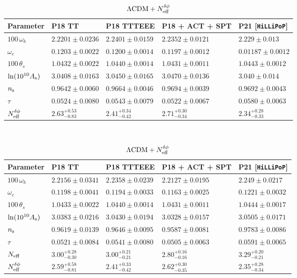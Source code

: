 \begin{subappendices}
\begin{table}
\begin{subtable}{\textwidth}
		\begin{tabular}{l l l l l}
				\toprule
			Parameter			& P18 TT					& P18 TTTEEE				& P18 + ACT + SPT			& P21 [\texttt{HiLLiPoP}]	\\
				\midrule[0.065em]
			$100\,\omega_b$		& $2.2201 \pm 0.0236$		& $2.2401 \pm 0.0159$		& $2.2352 \pm 0.0121$		& $2.229 \pm 0.013$			\\
			$\omega_c$			& $0.1203 \pm 0.0022$		& $0.1200 \pm 0.0014$		& $0.1197 \pm 0.0012$		& $0.01187 \pm 0.0012$		\\
			$100\,\theta_s$		& $1.0432 \pm 0.0022$		& $1.0440 \pm 0.0014$		& $1.0431 \pm 0.0011$		& $1.0443 \pm 0.0012$		\\
			$\ln(10^{10}A_\mathrm{s})$ & $3.0408 \pm 0.0163$		& $3.0450 \pm 0.0165$		& $3.0470 \pm 0.0136$		& $3.040 \pm 0.014$			\\
			$n_\mathrm{s}$				& $0.9642 \pm 0.0060$		& $0.9664 \pm 0.0046$		& $0.9694 \pm 0.0039$		& $0.9692 \pm 0.0043$		\\
			$\tau$				& $0.0524 \pm 0.0080$		& $0.0543 \pm 0.0079$		& $0.0522 \pm 0.0067$		& $0.0580 \pm 0.0063$		\\
			$N_\mathrm{eff}^{\delta\phi}$			& $2.63^{+0.53}_{-0.83}$	& $2.41^{+0.34}_{-0.42}$	& $2.71^{+0.30}_{-0.34}$	& $2.34^{+0.28}_{-0.33}$	\\
				\bottomrule
		\end{tabular}
	
		\caption{$\Lambda\mathrm{CDM} + N_\mathrm{eff}^{\delta\phi}$}
\end{subtable}\\[4pt]
	\begin{subtable}{\textwidth}
		\centering

		
		\begin{tabular}{l l l l l}
				\toprule
			Parameter			& P18 TT					& P18 TTTEEE				& P18 + ACT + SPT			& P21 [\texttt{HiLLiPoP}]	\\
				\midrule[0.065em]
			$100\,\omega_b$		& $2.2156 \pm 0.0341$		& $2.2358 \pm 0.0239$		& $2.2127 \pm 0.0195$		& $2.249 \pm 0.0217$		\\
			$\omega_c$			& $0.1198 \pm 0.0041$		& $0.1194 \pm 0.0033$		& $0.1163 \pm 0.0025$		& $0.1221 \pm 0.0032$		\\
			$100\,\theta_s$		& $1.0433 \pm 0.0022$		& $1.0440 \pm 0.0014$		& $1.0431 \pm 0.0011$		& $1.0444 \pm 0.0017$		\\
			$\ln(10^{10}A_\mathrm{s})$	& $3.0383 \pm 0.0216$		& $3.0430 \pm 0.0194$		& $3.0328 \pm 0.0157$		& $3.0505 \pm 0.0171$		\\
			$n_\mathrm{s}$				& $0.9619 \pm 0.0139$		& $0.9646 \pm 0.0095$		& $0.9587 \pm 0.0081$		& $0.9783 \pm 0.0086$		\\
			$\tau$				& $0.0521 \pm 0.0084$		& $0.0541 \pm 0.0080$		& $0.0505 \pm 0.0063$		& $0.0591 \pm 0.0065$		\\
			$N_\mathrm{eff}$				& $3.00^{+0.28}_{-0.30}$	& $3.00^{+0.21}_{-0.21}$	& $2.80^{+0.16}_{-0.16}$	& $3.29^{+0.20}_{-0.21}$	\\
			$N_\mathrm{eff}^{\delta\phi}$			& $2.59^{+0.58}_{-0.81}$	& $2.41^{+0.33}_{-0.42}$	& $2.62^{+0.30}_{-0.35}$	& $2.35^{+0.28}_{-0.34}$	\\
				\bottomrule
		\end{tabular}
	

\end{subtable}
\end{table}
\end{subappendices}
